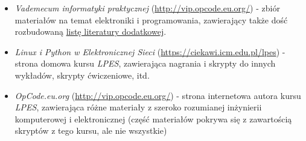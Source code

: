 % 
% 
% 
% 

\begin{itemize}
\item \emph{Vademecum informatyki praktycznej} (\url{http://vip.opcode.eu.org/}) - zbiór materiałów na temat elektroniki i programowania, zawierający także dość rozbudowaną \href{http://vip.opcode.eu.org/#Literatura}{listę literatury dodatkowej}.
\item \emph{Linux i Python w Elektronicznej Sieci} (\url{https://ciekawi.icm.edu.pl/lpes}) - strona domowa kursu \textit{LPES}, zawierająca nagrania i skrypty do innych wykładów, skrypty ćwiczeniowe, itd.
\item \emph{OpCode.eu.org} (\url{http://vip.opcode.eu.org/}) - strona internetowa autora kursu \textit{LPES}, zawierająca różne materiały z szeroko rozumianej inżynierii komputerowej i elektronicznej (część materiałów pokrywa się z zawartością skryptów z tego kursu, ale nie wszystkie)
\end{itemize}
